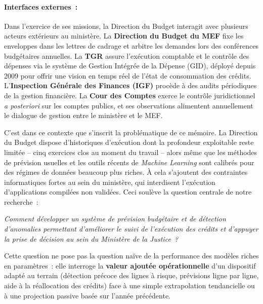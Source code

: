 \paragraph{Interfaces externes~:}

Dans l'exercice de ses missions, la Direction du Budget interagit avec plusieurs acteurs ext\'erieurs au minist\`ere. La \textbf{Direction du Budget du MEF} fixe les enveloppes dans les lettres de cadrage et arbitre les demandes lors des conf\'erences budg\'etaires annuelles. La \textbf{TGR} assure l'ex\'ecution comptable et le contr\^ole des d\'epenses via le syst\`eme de Gestion Int\'egr\'ee de la D\'epense (GID), d\'eploy\'e depuis 2009 pour offrir une vision en temps r\'eel de l'\'etat de consommation des cr\'edits. L'\textbf{Inspection G\'en\'erale des Finances (IGF)} proc\`ede \`a des audits p\'eriodiques de la gestion financi\`ere. La \textbf{Cour des Comptes} exerce le contr\^ole juridictionnel \textit{a posteriori} sur les comptes publics, et ses observations alimentent annuellement le dialogue de gestion entre le minist\`ere et le MEF.

C'est dans ce contexte que s'inscrit la probl\'ematique de ce m\'emoire. La Direction du Budget dispose d'historiques d'ex\'ecution dont la profondeur exploitable reste limit\'ee -- cinq exercices clos au moment du travail -- alors m\^eme que les m\'ethodes de pr\'evision usuelles et les outils r\'ecents de \textit{Machine Learning} sont calibr\'es pour des r\'egimes de donn\'ees beaucoup plus riches. \`A cela s'ajoutent des contraintes informatiques fortes au sein du minist\`ere, qui interdisent l'ex\'ecution d'applications compil\'ees non valid\'ees. Ceci soul\`eve la question centrale de notre recherche~:

\begin{center}
\textit{Comment d\'evelopper un syst\`eme de pr\'evision budg\'etaire et de d\'etection d'anomalies permettant d'am\'eliorer le suivi de l'ex\'ecution des cr\'edits et d'appuyer la prise de d\'ecision au sein du Minist\`ere de la Justice~?}
\end{center}

Cette question ne pose pas la question na\"ive de la performance des mod\`eles riches en param\`etres~: elle interroge la \textbf{valeur ajout\'ee op\'erationnelle} d'un dispositif adapt\'e au terrain (d\'etection pr\'ecoce des lignes \`a risque, pr\'evisions ligne par ligne, aide \`a la r\'eallocation des cr\'edits) face \`a une simple extrapolation tendancielle ou \`a une projection passive bas\'ee sur l'ann\'ee pr\'ec\'edente.

